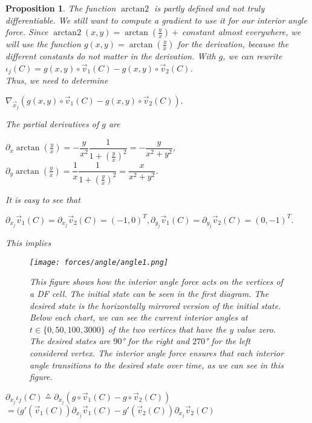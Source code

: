 \documentclass[a4paper,12pt,leqno]{article}
\theoremstyle{plain}
\newtheorem{proposition}[theorem]{Proposition}
\theoremstyle{remark}
\DeclareMathOperator{\atanxy}{arctan2}
\begin{document}
\begin{proposition}
	The function $\atanxy$ is partly defined and not truly differentiable. We still want to compute a gradient to use it for our interior angle force. Since $\atanxy(x,y) = \arctan(\frac{y}{x}) + \; constant$ almost everywhere, we will use the function $g(x,y) = \arctan(\frac{y}{x})$ for the derivation, because the different constants do not matter in the derivation. With $g$, we can rewrite $\iota_j(C) =g(x,y) \circ \vec{v}_1(C) - g(x,y) \circ \vec{v}_2(C) $. \\
	Thus, we need to determine 
	\begin{center}
		$
		\nabla_{\vec{x}_j} (g(x,y) \circ \vec{v}_1(C) - g(x,y) \circ \vec{v}_2(C)).
		$
	\end{center}
	The partial derivatives of $g$ are
	\begin{center}
		$\partial_{x} \arctan(\frac{y}{x}) = - \dfrac{y}{x^2} \dfrac{1}{1 + (\frac{y}{x})^2} = - \dfrac{y}{x^2 + y^2}$, \\
		$\partial_{y} \arctan(\frac{y}{x}) =  \dfrac{1}{x} \dfrac{1}{1 + (\frac{y}{x})^2} =  \dfrac{x}{x^2 + y^2}$.
	\end{center}
	It is easy to see that 
	\begin{center}
		$
		\partial_{x_j} \vec{v}_1(C) = \partial_{x_j} \vec{v}_2(C) = (-1,0)^T,
		\partial_{y_j} \vec{v}_1(C) = \partial_{y_j} \vec{v}_2(C) = (0, -1)^T. 
		$
	\end{center}
	This implies
	\begin{figure}[b!]
		\begin{center}
			\texttt{[image: forces/angle/angle1.png]}
			\caption{This figure shows how the interior angle force acts on the vertices of a DF cell. The initial state can be seen in the first diagram. The desired state is the horizontally mirrored version of the initial state. Below each chart, we can see the current interior angles at $t \in \{0,50,100,3000\}$ of the two vertices that have the $y$ value zero. The desired states are $90$° for the right and $270$° for the left considered vertex. The interior angle force ensures that each interior angle transitions to the desired state over time, as we can see in this figure. }
			\label{fig:angleForce}
		\end{center}
	\end{figure}
	\begin{center}
		$
		\partial_{x_j} \iota_j(C) 
		\corresponds \partial_{x_j}( g\circ \vec{v}_1(C) - g \circ \vec{v}_2(C))$ \\ \smallbreak	
		$= (g'(\vec{v}_1(C)) \partial_{x_j} \vec{v}_1(C) - g'(\vec{v}_2(C))\partial_{x_j} \vec{v}_2(C) $ \\ \smallbreak	

\end{center}
\end{proposition}
\end{document}
